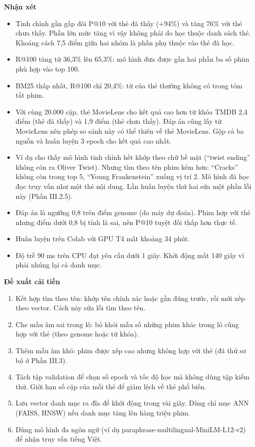 \documentclass[12pt,a4paper]{article}
\providecommand{\tightlist}{\setlength{\itemsep}{0pt}\setlength{\parskip}{0pt}}
\newcommand{\lbl}[1]{\Needspace{6\baselineskip}\textbf{#1}\par\nopagebreak}
\begin{document}
\lbl{Nhận xét}

\begin{itemize}
\tightlist
\item Tinh chỉnh gần gấp đôi P@10 với thẻ đã thấy (+94\%) và tăng 76\% với thẻ chưa thấy. Phần lớn mức tăng vì vậy không phải do học thuộc danh sách thẻ. Khoảng cách 7,5 điểm giữa hai nhóm là phần phụ thuộc vào thẻ đã học.
\item R@100 tăng từ 36,3\% lên 65,3\%: mô hình đưa được gần hai phần ba số phim phù hợp vào top 100.
\item BM25 thấp nhất, R@100 chỉ 20,4\%: từ của thẻ thường không có trong tóm tắt phim.
\item Với cùng 20.000 cặp, thẻ MovieLens cho kết quả cao hơn từ khóa TMDB 2,4 điểm (thẻ đã thấy) và 1,9 điểm (thẻ chưa thấy). Đáp án cũng lấy từ MovieLens nên phép so sánh này có thể thiên về thẻ MovieLens. Gộp cả ba nguồn và huấn luyện 3 epoch cho kết quả cao nhất.
\item Ví dụ cho thấy mô hình tinh chỉnh hết khớp theo chữ bề mặt (``twist ending'' không còn ra Oliver Twist). Nhưng tìm theo tên phim kém hơn: ``Cracks'' không còn trong top 5, ``Young Frankenstein'' xuống vị trí 2. Mô hình đã học đọc truy vấn như một thẻ nội dung. Lần huấn luyện thứ hai sửa một phần lỗi này (Phần III.2.5).
\item Đáp án là ngưỡng 0,8 trên điểm genome (do máy dự đoán). Phim hợp với thẻ nhưng điểm dưới 0,8 bị tính là sai, nên P@10 tuyệt đối thấp hơn thực tế.
\item Huấn luyện trên Colab với GPU T4 mất khoảng 34 phút.
\item Độ trễ 90 ms trên CPU đạt yêu cầu dưới 1 giây. Khởi động mất 140 giây vì phải nhúng lại cả danh mục.
\end{itemize}

\lbl{Đề xuất cải tiến}

\begin{enumerate}
\def\labelenumi{\arabic{enumi}.}
\tightlist
\item Kết hợp tìm theo tên: khớp tên chính xác hoặc gần đúng trước, rồi mới xếp theo vector. Cách này sửa lỗi tìm theo tên.
\item Che mẫu âm sai trong lô: bỏ khỏi mẫu số những phim khác trong lô cũng hợp với thẻ (theo genome hoặc từ khóa).
\item Thêm mẫu âm khó: phim được xếp cao nhưng không hợp với thẻ (đã thử sơ bộ ở Phần III.3).
\item Tách tập validation để chọn số epoch và tốc độ học mà không dùng tập kiểm thử. Giới hạn số cặp của mỗi thẻ để giảm lệch về thẻ phổ biến.
\item Lưu vector danh mục ra đĩa để khởi động trong vài giây. Dùng chỉ mục ANN (FAISS, HNSW) nếu danh mục tăng lên hàng triệu phim.
\item Dùng mô hình đa ngôn ngữ (ví dụ paraphrase-multilingual-MiniLM-L12-v2) để nhận truy vấn tiếng Việt.
\end{enumerate}
\end{document}
